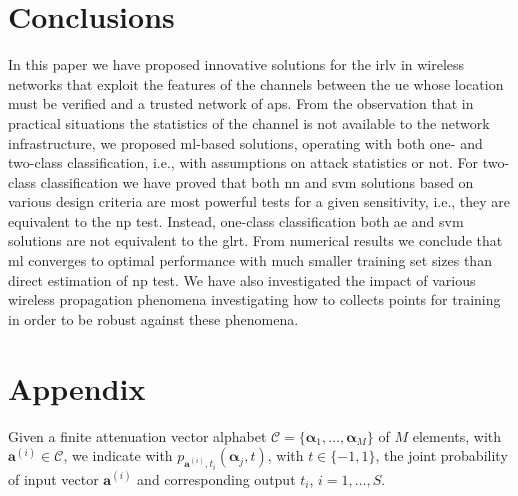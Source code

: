 \documentclass[draftcls,onecolumn,12pt]{IEEEtran}
\begin{document}
\section{Conclusions}

In this paper we have proposed innovative solutions for the \ac{irlv} in wireless networks that exploit the  features of the channels between the \ac{ue} whose location must be verified and a trusted network of \acp{ap}. From the observation that in practical situations the statistics of the channel is not available to the network infrastructure, we proposed \ac{ml}-based solutions, operating with both one- and two-class classification, i.e., with assumptions on attack statistics or not. For two-class classification we have proved that  both \ac{nn} and \ac{svm} solutions based on various design criteria are most powerful tests for a given sensitivity, i.e., they are equivalent to the \ac{np} test. Instead, one-class classification both \ac{ae} and \ac{svm} solutions are not equivalent to the \ac{glrt}. From numerical results we conclude that \ac{ml} converges to optimal performance with much smaller training set sizes than direct estimation of \ac{np} test. We have also investigated the impact of various wireless propagation phenomena investigating how to collects points for training in order to be robust against these phenomena.

\section*{Appendix}

	Given a finite  attenuation vector alphabet $\mathcal C = \{\bm{\alpha}_1, \ldots, \bm{\alpha}_M\}$ of $M$ elements, with $\bm{a}^{(i)} \in \mathcal C$, we indicate with $p_{\bm{a}^{(i)},t_i}(\bm{\alpha}_j, t)$, with $t \in \{-1,1\}$, the joint probability of input vector $\bm{a}^{(i)}$ and corresponding output $t_i$, $i=1, \ldots, S$.
	
\end{document}
